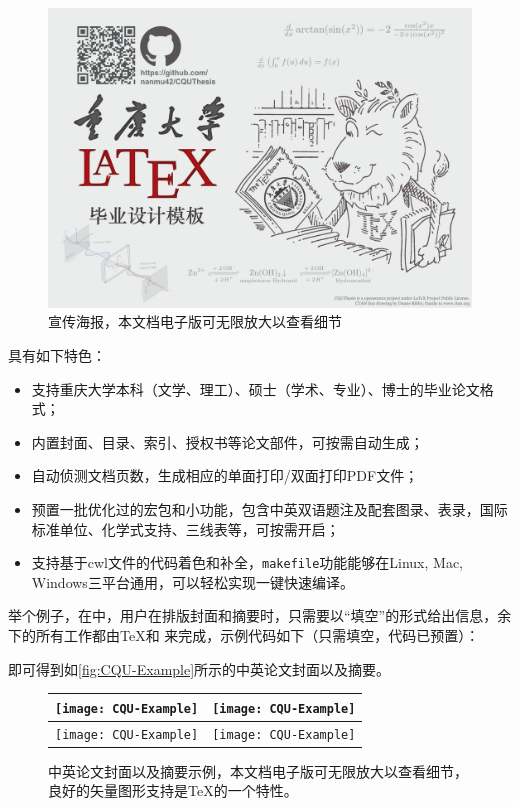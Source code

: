 \begin{figure}[tbh]
\centering
\includegraphics[angle=270,width=\linewidth,]{figures/CQUThesis-poster}
\caption[\cquthesis 宣传海报]{\cquthesis 宣传海报，本文档电子版可无限放大以查看细节}
\label{fig:cquthesis-poster}
\end{figure}

\cquthesis 具有如下特色：
\begin{itemize}
	\item 支持重庆大学本科（文学、理工）、硕士（学术、专业）、博士的毕业论文格式；
	\item 内置封面、目录、索引、授权书等论文部件，可按需自动生成；
	\item 自动侦测文档页数，生成相应的单面打印/双面打印PDF文件；
	\item 预置一批优化过的宏包和小功能，包含中英双语题注及配套图录、表录，国际标准单位、化学式支持、三线表等，可按需开启；
	\item 支持基于cwl文件的代码着色和补全，\texttt{makefile}功能能够在Linux, Mac, Windows三平台通用，可以轻松实现一键快速编译。
\end{itemize}

举个例子，在\cquthesis 中，用户在排版封面和摘要时，只需要以“填空”的形式给出信息，余下的所有工作都由\TeX 和 \cquthesis 来完成，示例代码如下（只需填空，代码已预置）：



即可得到如\autoref{fig:CQU-Example}所示的中英论文封面以及摘要。

\begin{figure}[p]
	\centering
	\begin{tabular}{|c@{}|c@{}|}
		\hline
		\texttt{[image: CQU-Example]} & 
		\texttt{[image: CQU-Example]} \\
		\hline
		\texttt{[image: CQU-Example]} & 
		\texttt{[image: CQU-Example]} \\
		\hline
	\end{tabular}
	\caption[\cquthesis 中英论文封面以及摘要示例]{\cquthesis 中英论文封面以及摘要示例，本文档电子版可无限放大以查看细节，良好的矢量图形支持是\TeX 的一个特性。 }
	\label{fig:CQU-Example}
\end{figure}

